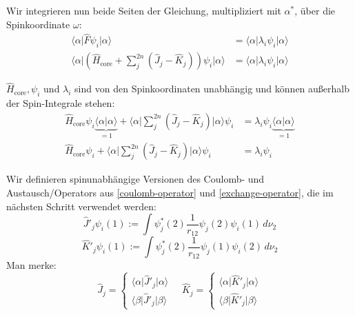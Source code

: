 Wir integrieren nun beide Seiten der Gleichung,
multipliziert mit $\alpha^*$, über die Spinkoordinate $\omega$:
\begin{align*}
  \langle \alpha \vert \hat{F} \psi_i \vert \alpha \rangle &= 
  \langle \alpha \vert\lambda_i \psi_i \vert \alpha \rangle\\
  \langle \alpha \vert \left(\hat{H}_{\text{core}} + \sum_j^{2n} 
  \left( \hat{J}_j - \hat{K}_j \right)\right) \psi_i \vert \alpha \rangle &= 
  \langle \alpha \vert \lambda_i \psi_i \vert \alpha \rangle
\end{align*}

$\hat{H}_{\text{core}}, \psi_i$ und $\lambda_i$ sind von den Spinkoordinaten unabhängig und
können außerhalb der Spin-Integrale stehen:
\begin{align}
  \hat{H}_{\text{core}} \psi_i \underbrace{\langle \alpha \vert \alpha \rangle}_{=1} +
  \langle \alpha \vert \sum_j^{2n} 
  \left( \hat{J}_j - \hat{K}_j \right) \vert \alpha \rangle \psi_i 
  &= \lambda_i \psi_i \underbrace{\langle \alpha \vert \alpha \rangle}_{=1} \nonumber\\
  \hat{H}_{\text{core}} \psi_i + \langle \alpha \vert \sum_j^{2n}
  \left( \hat{J}_j - \hat{K}_j \right) \vert \alpha \rangle \psi_i 
  &= \lambda_i \psi_i
\end{align}

Wir definieren spinunabhängige Versionen des Coulomb- und Austausch\-/Operators
aus \cref{coulomb-operator} und \cref{exchange-operator},
die im nächsten Schritt verwendet werden:
\begin{equation}\label{spinless-coulomb-operator}
    \hat{J}'_j \psi_i(1):= 
    \int \psi_j^*(2) \frac{1}{r_{12}} \psi_j(2) \psi_i(1) \,d\nu_2 
\end{equation}
\begin{equation}\label{spinless-exchange-operator}
    \hat{K}'_j \psi_i(1) :=
  \int \psi_j^*(2) \frac{1}{r_{12}} \psi_j(1) \psi_i(2) \,d\nu_2
\end{equation}
Man merke:
\begin{equation}
    \hat{J}_j = \begin{cases}
        \langle \alpha \vert \hat{J}'_j \vert \alpha \rangle\\
        \langle \beta \vert \hat{J}'_j \vert \beta \rangle
    \end{cases}\quad
    \hat{K}_j = \begin{cases}
        \langle \alpha \vert \hat{K}'_j \vert \alpha \rangle\\
        \langle \beta \vert \hat{K}'_j \vert \beta \rangle
    \end{cases}
\end{equation}

